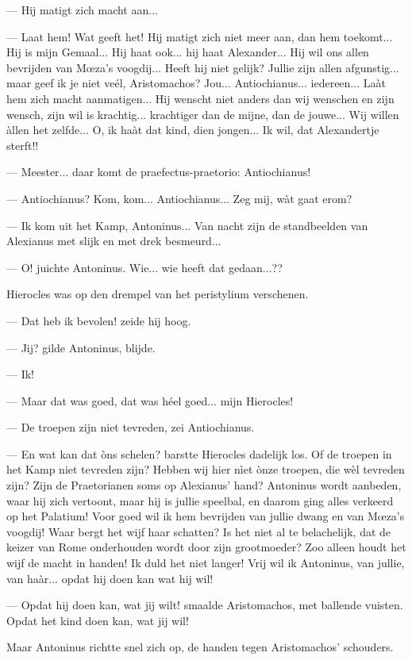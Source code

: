 \documentclass[a4paper, 12pt, oneside, dutch]{article}
\begin{document}
--- Hij matigt zich macht aan...

--- Laat hem! Wat geeft het! Hij matigt zich niet meer aan, dan hem toekomt... Hij is mijn Gemaal... Hij haat ook... hij haat Alexander... Hij wil ons allen bevrijden van Mœza's voogdij... Heeft hij niet gelijk? Jullie zijn allen afgunstig... maar geef ik je niet veél, Aristomachos? Jou... Antiochianus... iedereen... Laàt hem zich macht aanmatigen... Hij wenscht niet anders dan wij wenschen en zijn wensch, zijn wil is krachtig... krachtiger dan de mijne, dan de jouwe... Wij willen àllen het zelfde... O, ik haàt dat kind, dien jongen... Ik wil, dat Alexandertje sterft!!

--- Meester... daar komt de praefectus-praetorio: Antiochianus!

--- Antiochianus? Kom, kom... Antiochianus... Zeg mij, wàt gaat erom?

--- Ik kom uit het Kamp, Antoninus... Van nacht zijn de standbeelden van Alexianus met slijk en met drek besmeurd...

--- O! juichte Antoninus. Wie... wie heeft dat gedaan...??

Hierocles was op den drempel van het peristylium verschenen.

--- Dat heb ik bevolen! zeide hij hoog.

--- Jij? gilde Antoninus, blijde.

--- Ik!

--- Maar dat was goed, dat was héel goed... mijn Hierocles!

--- De troepen zijn niet tevreden, zei Antiochianus.

--- En wat kan dat òns schelen? barstte Hierocles dadelijk los. Of de troepen in het Kamp niet tevreden zijn? Hebben wij hier nìet ònze troepen, die wèl tevreden zijn? Zijn de Praetorianen soms op Alexianus' hand? Antoninus wordt aanbeden, waar hij zich vertoont, maar hij is jullie speelbal, en daarom ging alles verkeerd op het Palatium! Voor goed wil ik hem bevrijden van jullie dwang en van Mœza's voogdij! Waar bergt het wijf haar schatten? Is het niet al te belachelijk, dat de keizer van Rome onderhouden wordt door zijn grootmoeder? Zoo alleen houdt het wijf de macht in handen! Ik duld het niet langer! Vrij wil ik Antoninus, van jullie, van haàr... opdat hij doen kan wat hij wil!

--- Opdat hij doen kan, wat jij wilt! smaalde Aristomachos, met ballende vuisten. Opdat het kind doen kan, wat jij wil!

Maar Antoninus richtte snel zich op, de handen tegen Aristomachos' schouders.
\end{document}
